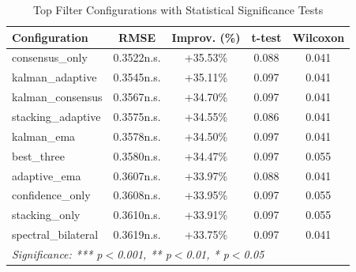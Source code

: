 \begin{table}[htbp]
\centering
\caption{Top Filter Configurations with Statistical Significance Tests}
\label{tab:statistical-significance}
\begin{tabular}{l|c|c|c|c}
\hline
\textbf{Configuration} & \textbf{RMSE} & \textbf{Improv. (\%)} & \textbf{t-test} & \textbf{Wilcoxon} \\
\hline
consensus\_only & 0.3522n.s. & +35.53\% & 0.088 & 0.041 \\
kalman\_adaptive & 0.3545n.s. & +35.11\% & 0.097 & 0.041 \\
kalman\_consensus & 0.3567n.s. & +34.70\% & 0.097 & 0.041 \\
stacking\_adaptive & 0.3575n.s. & +34.55\% & 0.086 & 0.041 \\
kalman\_ema & 0.3578n.s. & +34.50\% & 0.097 & 0.041 \\
best\_three & 0.3580n.s. & +34.47\% & 0.097 & 0.055 \\
adaptive\_ema & 0.3607n.s. & +33.97\% & 0.088 & 0.041 \\
confidence\_only & 0.3608n.s. & +33.95\% & 0.097 & 0.055 \\
stacking\_only & 0.3610n.s. & +33.91\% & 0.097 & 0.055 \\
spectral\_bilateral & 0.3619n.s. & +33.75\% & 0.097 & 0.041 \\
\hline
\multicolumn{5}{l}{\textit{Significance: *** p$<$0.001, ** p$<$0.01, * p$<$0.05}} \\
\hline
\end{tabular}
\end{table}